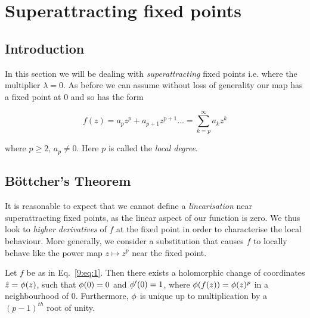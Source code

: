 \documentclass[../main.tex]{subfiles}
\begin{document}
\section{Superattracting fixed points} 
\label{sec:9}

\subsection{Introduction}

In this section we will be dealing with \emph{superattracting} fixed points i.e. where the multiplier $\lambda = 0$. As before we can assume without loss of generality our map has a fixed point at 0 and so has the form

\begin{equation}
    \label{9:eq:1}
    f(z) = a_pz^p + a_{p+1}z^{p+1}\dots = \sum_{k=p}^{\infty} a_{k}z^k
\end{equation}

where $p\geq 2$, $a_p \neq 0$. Here $p$ is called the \emph{local degree}. 

\subsection{Böttcher's Theorem}

It is reasonable to expect that we cannot define a \emph{linearisation} near superattracting fixed points, as the linear aspect of our function is zero. We thus look to \emph{higher derivatives} of $f$ at the fixed point in order to characterise the local behaviour. More generally, we consider a substitution that causes $f$ to locally behave like the power map $z \mapsto z^p$ near the fixed point.

\begin{thm}
    \label{9:thm:bottcher}
    Let $f$ be as in Eq.~\ref{9:eq:1}. Then there exists a holomorphic change of coordinates $\hat{z} = \phi(z)$, such that $\phi(0) = 0$ and $\phi'(0) = 1$, where $\phi(f(z)) = \phi(z)^p$ in a neighbourhood of 0. Furthermore, $\phi$ is unique up to multiplication by a $(p-1)^{th}$ root of unity. 
\end{thm}
\end{document}
